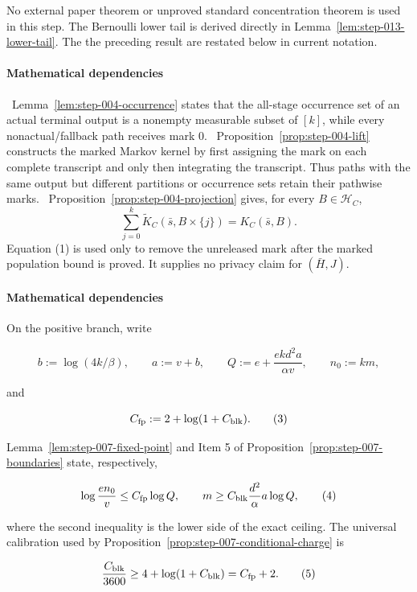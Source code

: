 No external paper theorem or unproved standard concentration theorem is
used in this step. The Bernoulli lower tail is derived directly in
Lemma~\ref{lem:step-013-lower-tail}. The the preceding result are
restated below in current notation.

\paragraph{Mathematical dependencies}

\noindent\textbullet\ Lemma~\ref{lem:step-004-occurrence} states that the all-stage
  occurrence set of an actual terminal output is a nonempty measurable
  subset of \([k]\), while every nonactual/fallback path receives mark
  \(0\).
\noindent\textbullet\ Proposition~\ref{prop:step-004-lift} constructs the marked
  Markov kernel by first assigning the mark on each complete transcript and
  only then integrating the transcript. Thus paths with the same output but
  different partitions or occurrence sets retain their pathwise marks.
\noindent\textbullet\ Proposition~\ref{prop:step-004-projection} gives, for every
  \(B\in\mathcal H_C\),
  \[
    \sum_{j=0}^k\widetilde K_C(\bar s,B\times\{j\})
    =K_C(\bar s,B).
    \tag{1}
  \]
  Equation (1) is used only to remove the unreleased mark after the marked
  population bound is proved. It supplies no privacy claim for
  \((\bar H,J)\).

\paragraph{Mathematical dependencies}

On the positive branch, write

\[
 b:=\log(4k/\beta),\qquad a:=v+b,
 \qquad Q:=e+\frac{ekd^2a}{\alpha v},
 \qquad n_0:=km,
 \tag{2}
\]

and

\[
 C_{\rm fp}:=2+\log(1+C_{\rm blk}).
 \tag{3}
\]

Lemma~\ref{lem:step-007-fixed-point} and Item 5 of Proposition~\ref{prop:step-007-boundaries} state, respectively,

\[
 \log\frac{en_0}{v}\leq C_{\rm fp}\log Q,
 \qquad
 m\geq C_{\rm blk}\frac{d^2}{\alpha}a\log Q,
 \tag{4}
\]

where the second inequality is the lower side of the exact 
ceiling. The  universal calibration used by
Proposition~\ref{prop:step-007-conditional-charge} is

\[
 \frac{C_{\rm blk}}{3600}
 \geq4+\log(1+C_{\rm blk})=C_{\rm fp}+2.
 \tag{5}
\]

